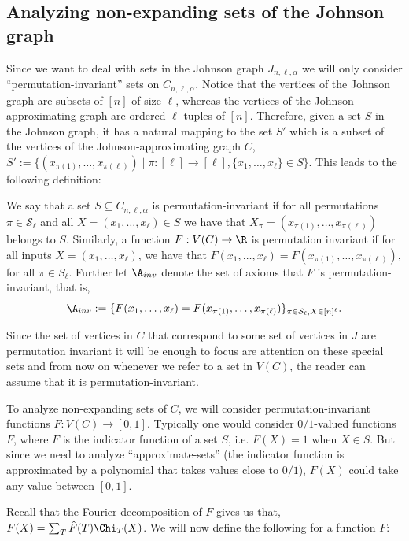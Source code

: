 \subsection{Analyzing non-expanding sets of the Johnson graph}
Since we want to deal with sets in the Johnson graph $J_{n,\ell,\alpha}$ we will only consider ``permutation-invariant'' sets on $C_{n,\ell,
\alpha}$. Notice that the vertices of the Johnson graph are subsets of $[n]$ of size $\ell$, whereas the vertices of the Johnson-approximating graph are ordered $\ell$-tuples of $[n]$. Therefore, given a set $S$ in the Johnson graph, it has a natural mapping to the set $S'$ which is a subset of the vertices of the Johnson-approximating graph $C$, 
$S' := \{(x_{\pi(1)},\ldots,x_{\pi(\ell)}) \mid \pi: [\ell] \rightarrow [\ell], \{x_1,\ldots,x_{\ell}\} \in S\}$. This leads to the following definition:

\begin{definition}\label{def:perm-inv}
We say that a set $S \subseteq C_{n,\ell,\alpha}$ is permutation-invariant if for all permutations $\pi \in \mathcal{S}_\ell$ and all $X = (x_1,\ldots,x_\ell) \in S$ we have that $X_{\pi} = (x_{\pi(1)},\ldots,x_{\pi(\ell)})$ belongs to $S$. Similarly, a function $F: V(C) \rightarrow \R$ is permutation invariant if for all inputs $X = (x_1,\ldots,x_{\ell})$, we have that $F(x_1,\ldots,x_\ell) = F(x_{\pi(1)},\ldots,x_{\pi(\ell)})$, for all $\pi\in S_{\ell}$. Further let $\A_{inv}$ denote the set of axioms that $F$ is permutation-invariant, that is, 
\[\A_{inv} := \{F(x_1,\ldots,x_\ell) = F(x_{\pi(1)},\ldots,x_{\pi(\ell)})\}_{\pi \in \mathcal{S}_\ell, X \in [n]^\ell}.\]
\end{definition}

Since the set of vertices in $C$ that correspond to some set of vertices in $J$ are permutation invariant it will be enough to focus are attention on these special sets and from now on whenever we refer to a set in $V(C)$, the reader can assume that it is permutation-invariant.

To analyze non-expanding sets of $C$, we will consider permutation-invariant functions $F: V(C) \rightarrow [0,1]$. Typically one would consider $0/1$-valued functions $F$, where $F$ is the indicator function of a set $S$, i.e. $F(X) = 1$ when $X \in S$. But since we need to analyze ``approximate-sets'' (the indicator function is approximated by a polynomial that takes values close to $0/1$), $F(X)$ could take any value between $[0,1]$.

Recall that the Fourier decomposition of $F$ gives us that, $F(X) = \sum_T \hat{F}(T)\Chi_T(X)$. We will now define the following for a function $F$:

